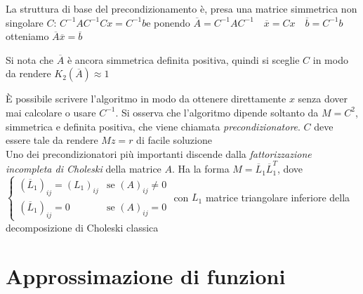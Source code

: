 \documentclass[openany]{book}
\begin{document}
La struttura di base del precondizionamento è, presa una matrice simmetrica non singolare $C$: $C^{-1}AC^{-1}Cx=C^{-1}b$\quad e ponendo $\overline{A}=C^{-1}AC^{-1} \quad \overline{x}=Cx \quad \overline{b}=C^{-1}b$\quad otteniamo $\overline{A}\overline{x}=\overline{b}$

Si nota che $\overline{A}$ è ancora simmetrica definita positiva, quindi si sceglie $C$ in modo da rendere $K_2(\overline{A})\approx 1$

È possibile scrivere l'algoritmo in modo da ottenere direttamente $x$ senza dover mai calcolare o usare $C^{-1}$. Si osserva che l'algoritmo dipende soltanto da $M=C^2$, simmetrica e definita positiva, che viene chiamata \textit{precondizionatore}. $C$ deve essere tale da rendere $Mz=r$ di facile soluzione 
\\

Uno dei precondizionatori più importanti discende dalla \textit{fattorizzazione incompleta di Choleski} della matrice $A$. Ha la forma $M=\overline{L}_1\overline{L}_1^T$, dove
$\left\{ \begin{array}{ll}(\overline{L}_1)_{ij}=(L_1)_{ij} & \text{se } (A)_{ij}\neq 0 \\ (\overline{L}_1)_{ij}=0 & \text{se } (A)_{ij}=0\end{array} \right.$ con $L_1$ matrice triangolare inferiore della decomposizione di Choleski classica

\chapter{Approssimazione di funzioni}
\end{document}
